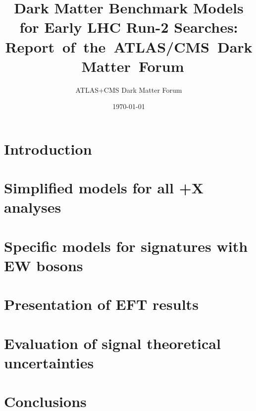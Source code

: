 \documentclass[a4paper,debug,notitlepage,nobib]{tufte-book}
\title{Dark Matter Benchmark Models for Early LHC Run-2 Searches:
	Report~of~the~ATLAS/CMS~Dark~Matter~Forum}
\author{ATLAS+CMS Dark Matter Forum}
\date{\today}
\begin{document}
\morefloats
\setcounter{secnumdepth}{3} %



\setcounter{tocdepth}{3}
\tableofcontents
 
\pagebreak

\chapter{Introduction}
\label{sec:Introduction}



\chapter{\texorpdfstring{Simplified models for all \MET+X analyses}{Simplified models for all MET+X analyses}}
\label{subsec:MonojetLikeModels}


%

\chapter{Specific models for signatures with EW bosons}
\label{subsec:EWSpecificModels}



\chapter{Presentation of EFT results}
\label{sec:EFTValidity} 


\chapter{Evaluation of signal theoretical uncertainties}
\label{sec:TheoryUncertainties} 


\chapter{Conclusions}
\label{chapter:conclusions}

 
\end{document}
